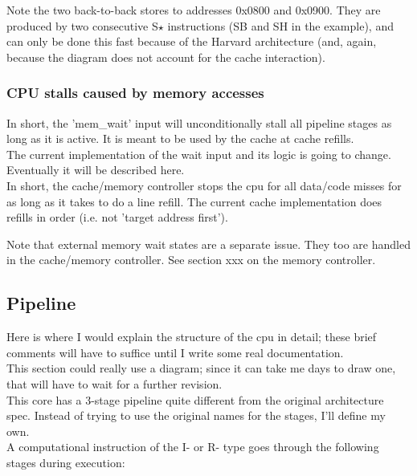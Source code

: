 \documentclass[11pt]{article}
\begin{document}
    Note the two back-to-back stores to addresses 0x0800 and 0x0900. They are
    produced by two consecutive S$\star$ instructions (SB and SH in the example),
    and can only be done this fast because of the Harvard architecture (and,
    again, because the diagram does not account for the cache interaction).\\
    
    
\subsubsection{CPU stalls caused by memory accesses}
\label{memory_cpu_stalls}

    In short, the 'mem\_wait' input will unconditionally stall all pipeline
    stages as long as it is active. It is meant to be used by the cache at cache 
    refills.\\

    The current implementation of the wait input and its logic is going
    to change. Eventually it will be described here.\\

    In short, the cache/memory controller stops the cpu for all data/code 
    misses for as long as it takes to do a line refill. The current cache 
    implementation does refills in order (i.e. not 'target address first').

    Note that external memory wait states are a separate issue. They too are 
    handled in the cache/memory controller. See section xxx on the memory
    controller.

\subsection{Pipeline}
\label{pipeline}

    Here is where I would explain the structure of the cpu in detail; these 
    brief comments will have to suffice until I write some real documentation.\\
    
    This section could really use a diagram; since it can take me days to draw 
    one, that will have to wait for a further revision.\\
    
    This core has a 3-stage pipeline quite different from the original 
    architecture spec. Instead of trying to use the original names for the
    stages, I'll define my own.\\
    
    A computational instruction of the I- or R- type goes through the following
    stages during execution:\\
\end{document}
